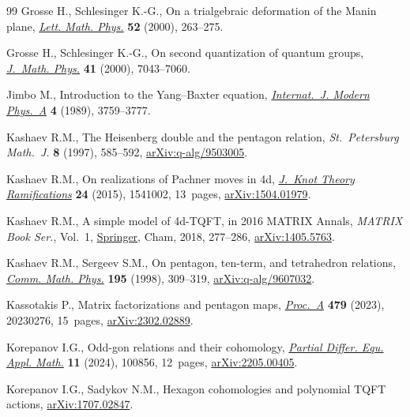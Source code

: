 \documentclass[pdftex]{sigma}
\numberwithin{equation}{section}
\theoremstyle{definition}
\begin{document}
\begin{thebibliography}{99}
Grosse H., Schlesinger K.-G., On a trialgebraic deformation of the {M}anin
 plane, \href{https://doi.org/10.1023/A:1007666919616}{\textit{Lett. Math.
 Phys.}} \textbf{52} (2000), 263--275.

Grosse H., Schlesinger K.-G., On second quantization of quantum groups,
 \href{https://doi.org/10.1063/1.1288798}{\textit{J.~Math. Phys.}} \textbf{41}
 (2000), 7043--7060.

Jimbo M., Introduction to the {Y}ang--{B}axter equation,
 \href{https://doi.org/10.1142/S0217751X89001503}{\textit{Internat.~J. Modern
 Phys.~A}} \textbf{4} (1989), 3759--3777.

Kashaev R.M., The {H}eisenberg double and the pentagon relation,
 \textit{St.~Petersburg Math.~J.} \textbf{8} (1997), 585--592,
 \href{https://arxiv.org/abs/q-alg/9503005}{arXiv:q-alg/9503005}.

Kashaev R.M., On realizations of {P}achner moves in 4d,
 \href{https://doi.org/10.1142/S0218216515410023}{\textit{J.~Knot Theory
 Ramifications}} \textbf{24} (2015), 1541002, 13~pages,
 \href{https://arxiv.org/abs/1504.01979}{arXiv:1504.01979}.

Kashaev R.M., A simple model of 4d-{TQFT}, in 2016 {MATRIX} Annals,
 \textit{MATRIX Book Ser.}, Vol.~1,
 \href{https://doi.org/10.1007/978-3-319-72299-3_14}{Springer}, Cham, 2018,
 277--286, \href{https://arxiv.org/abs/1405.5763}{arXiv:1405.5763}.

Kashaev R.M., Sergeev S.M., On pentagon, ten-term, and tetrahedron relations,
 \href{https://doi.org/10.1007/s002200050391}{\textit{Comm. Math. Phys.}}
 \textbf{195} (1998), 309--319,
 \href{https://arxiv.org/abs/q-alg/9607032}{arXiv:q-alg/9607032}.

Kassotakis P., Matrix factorizations and pentagon maps,
 \href{https://doi.org/10.1098/rspa.2023.0276}{\textit{Proc.~A}} \textbf{479}
 (2023), 20230276, 15~pages,
 \href{https://arxiv.org/abs/2302.02889}{arXiv:2302.02889}.

Korepanov I.G., Odd-gon relations and their cohomology, \href{https://doi.org/10.1016/j.padiff.2024.100856}{\textit{Partial Differ. Equ. Appl. Math.}} \textbf{11} (2024), 100856, 12~pages,
 \href{https://arxiv.org/abs/2205.00405}{arXiv:2205.00405}.

Korepanov I.G., Sadykov N.M., Hexagon cohomologies and polynomial {TQFT}
 actions, \href{https://arxiv.org/abs/1707.02847}{arXiv:1707.02847}.


\end{thebibliography}
\end{document}
